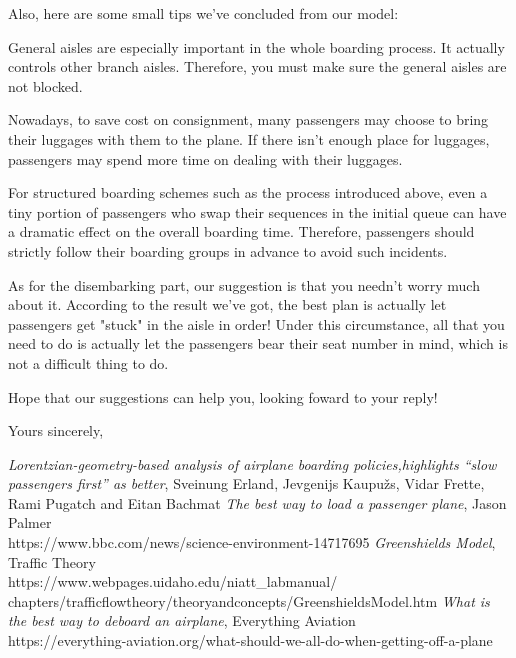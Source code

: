 \documentclass{article}
\theoremstyle{definition}
\theoremstyle{remark}
\numberwithin{equation}{section}
\begin{document}
	Also, here are some small tips we've concluded from our model:
	\begin{enumerate}

		General aisles are especially important in the whole boarding process. It actually controls other branch aisles. Therefore, you must make sure the general aisles are not blocked.

		Nowadays, to save cost on consignment, many passengers may choose to bring their luggages with them to the plane. If there isn't enough place for luggages, passengers may spend more time on dealing with their luggages.

		For structured boarding schemes such as the process introduced above, even a tiny portion of passengers who swap their sequences in the initial queue can have a dramatic effect on the overall boarding time. Therefore, passengers should strictly follow their boarding groups in advance to avoid such incidents.
	\end{enumerate}

	As for the disembarking part, our suggestion is that you needn't worry much about it. According to the result we've got, the best plan is actually let passengers get "stuck" in the aisle in order! Under this circumstance, all that you need to do is actually let the passengers bear their seat number in mind, which is  not a difficult thing to do.


	Hope that our suggestions can help you, looking foward to your reply!

	\noindent Yours sincerely,

	\noindent {}


	\newpage
	\thispagestyle{empty}
	\renewcommand\refname{References}
	\begin{thebibliography}{100}
	 \textit{Lorentzian-geometry-based analysis of airplane boarding policies,highlights “slow passengers first” as better},
	Sveinung Erland, Jevgenijs Kaupužs, Vidar Frette, Rami Pugatch and  Eitan Bachmat
	 \textit{The best way to load a passenger plane}, Jason Palmer\\
	https://www.bbc.com/news/science-environment-14717695
	 \textit{Greenshields Model}, Traffic Theory\\
	https://www.webpages.uidaho.edu/niatt\_labmanual/\\chapters/trafficflowtheory/theoryandconcepts/GreenshieldsModel.htm
	 \textit{What is the best way to deboard an airplane}, Everything Aviation\\
	https://everything-aviation.org/what-should-we-all-do-when-getting-off-a-plane
	\end{thebibliography}
\end{document}

